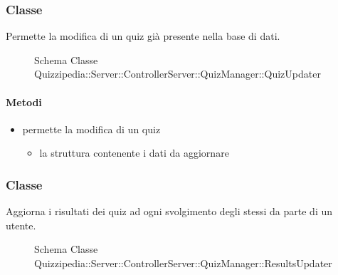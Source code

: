 \subsubsection{Classe }
Permette la modifica di un quiz già presente nella base di dati.
\begin{figure}[H]
\centering
\noindent{}
\caption[Schema Classe QuizUpdater]{Schema Classe Quizzipedia::Server::ControllerServer::QuizManager::QuizUpdater}
\end{figure}
\paragraph{Metodi}
\begin{itemize}
\item {}
\newline
permette la modifica di un quiz
\newline
{}
\newline
\begin{itemize}
\item {}
\newline
la struttura contenente i dati da aggiornare
\end{itemize}
\end{itemize}
\subsubsection{Classe }
Aggiorna i risultati dei quiz ad ogni svolgimento degli stessi da parte di un utente.
\begin{figure}[H]
\centering
\noindent{}
\caption[Schema Classe ResultsUpdater]{Schema Classe Quizzipedia::Server::ControllerServer::QuizManager::ResultsUpdater}
\end{figure}
